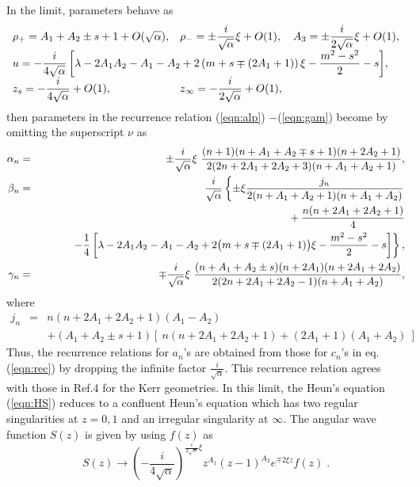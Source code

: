 In the limit, parameters behave as
%
\begin{eqnarray}
\begin{array}{lll}
\rho_+ = A_1+A_2 \pm s+1+O(\sqrt{\alpha}),& 
\rho_- = \displaystyle{\pm \frac{i}{\sqrt{\alpha}} \xi +O(1)},& 
A_3 = \displaystyle{\pm \frac{i}{2\sqrt{\alpha}}\xi +O(1)}, \\
\multicolumn{3}{l}{
u =  \displaystyle{-\frac{i}{4\sqrt{\alpha}} \left[ 
\lambda-2A_1 A_2 -A_1 -A_2 +2\left(m+s \mp (2A_1 +1)\right)\xi 
-\frac{m^2-s^2}{2}-s \right]},} \\
z_s = \displaystyle{-\frac{i}{4\sqrt{\alpha}} +O(1)},& 
z_\infty = \displaystyle{-\frac{i}{2\sqrt{\alpha}} +O(1)},& \
\end{array}
\end{eqnarray}
%
then parameters in the recurrence relation (\ref{eqn:alp})
$-$(\ref{eqn:gam}) become by omitting the superscript $\nu$ as 
%
\begin{eqnarray}
\alpha_n &=&
\pm \frac{i}{\sqrt{\alpha}}\xi \ 
\frac{(n+1)(n+A_1+A_2 \mp s +1)(n+2A_2+1)}
{2(2n+2A_1+2A_2+3)(n+A_1+A_2+1)}, \\
\beta_n &=& 
\frac{i}{\sqrt{\alpha}} \left\{
\pm \xi \frac{j_n}
{2(n+A_1+A_2+1)(n+A_1+A_2)} \right.\nonumber \\
&& \makebox[10mm]{} + \frac{n(n+2A_1+2A_2+1)}{4} \\
&& \makebox[10mm]{} \left. -\frac{1}{4}\left[ 
\lambda-2A_1 A_2 -A_1 -A_2 +2\big(m+s \mp (2A_1 +1)\big)\xi 
-\frac{m^2-s^2}{2}-s \right] \right\}, \nonumber \\
\gamma_n &=& 
\mp\frac{i}{\sqrt{\alpha}}\xi \ 
\frac{(n+A_1+A_2\pm s)(n+2A_1)(n+2A_1+2A_2)}
{2(2n+2A_1+2A_2-1)(n+A_1+A_2)},
\end{eqnarray}
%
where
%
\begin{eqnarray}
j_n &=& n(n+2A_1+2A_2+1)(A_1-A_2) \nonumber \\
& & +(A_1+A_2 \pm s+1)
[ \ n(n+2A_1+2A_2+1)+(2A_1+1)(A_1+A_2) \ ] \nonumber
\end{eqnarray}
%
Thus, the recurrence relations for $a_n$'s are obtained from 
those for $c_n$'s in eq.(\ref{eqn:rec}) by dropping the infinite 
factor $\displaystyle{\frac{i}{\sqrt{\alpha}}}$. This recurrence 
relation agrees  with those in Ref.4 for the Kerr geometries. 
In this limit, the Heun's equation (\ref{eqn:HS}) reduces to a 
confluent Heun's equation which has two regular singularities 
at $z=0, 1$ and an irregular singularity at $\infty$. 
The angular wave function $S(z)$ is given by using $f(z)$ as
%
\begin{equation}
S(z) \longrightarrow 
\left(-\frac{i}{4\sqrt{\alpha}}\right)^{\frac{i}{2\sqrt{\alpha}} \xi} 
z^{A_1} (z-1)^{A_2} e^{\mp 2\xi z} f(z)\;.
\end{equation}
%

